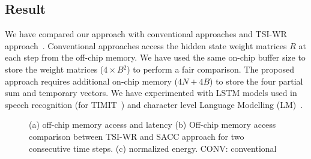 \documentclass[a4paper,10pt]{article}
\begin{document}
\subsection{Result}
We have compared our approach with conventional approaches and TSI-WR approach~\cite{park2020time}. Conventional approaches access the hidden state weight matrices $R$ at each step from the off-chip memory. We have used the same on-chip buffer size to store the weight matrices ($4{\times}B{^2}$) to perform a fair comparison. The proposed approach requires additional on-chip memory ($4N{+}4B$) to store the four partial sum and temporary vectors.
We have experimented with LSTM models used in speech recognition (for TIMIT~\cite{garofolo1993timit}) and character level Language Modelling (LM)~\cite{sundermeyer2015feedforward}.
\begin{figure}[!htb]
	\centering
	\hfil
	\caption{(a) off-chip memory access and latency (b) Off-chip memory access comparison between TSI-WR and SACC approach for two consecutive time steps. (c) normalized energy. CONV: conventional}	\label{fig:compareMemAccessAndRunTime}
	\vspace{-1.0em}	
\end{figure}
\end{document}
